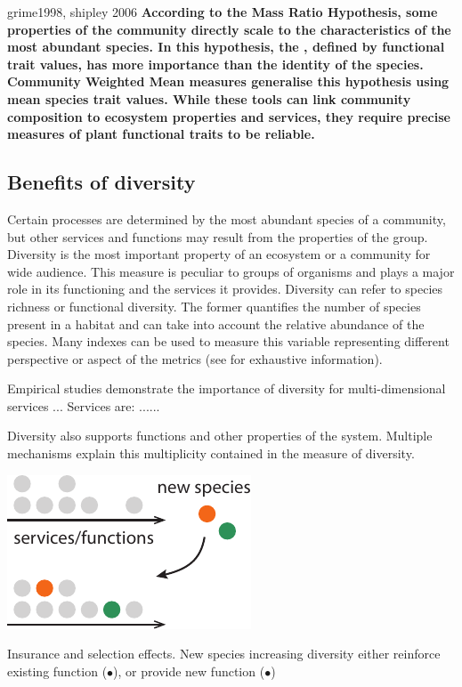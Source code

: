 grime1998, shipley 2006
\textbf{According to the Mass Ratio Hypothesis, some properties of the community directly scale to the characteristics of the most abundant species. In this hypothesis, the , defined by functional trait values, has more importance than the identity of the species. Community Weighted Mean measures generalise this hypothesis using mean species trait values. While these tools can link community composition to ecosystem properties and services, they require precise measures of plant functional traits to be reliable.}

\subsection{Benefits of diversity}

Certain processes are determined by the most abundant species of a community, but other services and functions may result from the properties of the group. Diversity is the most important property of an ecosystem or a community for wide audience. This measure is peculiar to groups of organisms and plays a major role in its functioning and the services it provides. Diversity can refer to species richness or functional diversity. The former quantifies the number of species present in a habitat and can take into account the relative abundance of the species. Many indexes can be used to measure this variable representing different perspective or aspect of the metrics (see \cite{chalmandrier_communities_2015} for exhaustive information).

Empirical studies demonstrate the importance of diversity for multi-dimensional services ... Services are: ......

Diversity also supports functions and other properties of the system. Multiple mechanisms explain this multiplicity contained in the measure of diversity. 


\begin{marginfigure}
    \includegraphics{./Figures/insurance_m.pdf}
  \caption[Diversity insurance effect]{Insurance and selection effects. New species increasing diversity either reinforce existing function (\textcolor{myOrange}{$\bullet$}), or provide new function (\textcolor{myGreen}{$\bullet$})}
  \label{fig:insurance}
\end{marginfigure}


